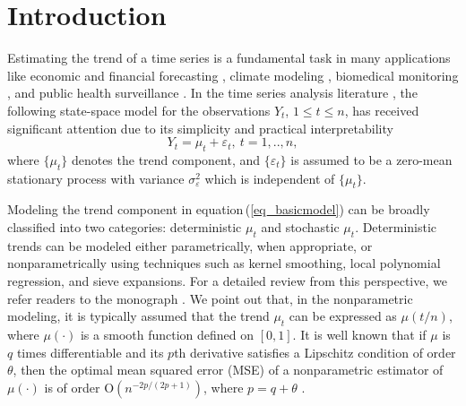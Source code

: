 \documentclass[11pt]{article}
\numberwithin{equation}{section}
\numberwithin{figure}{section}
\begin{document}
\section{Introduction}
Estimating the trend of a time series is a fundamental task in many applications like economic and financial forecasting \cite{hatanaka1996,tsay2010analysis}, climate modeling \cite{MUDELSEE2019310}, biomedical monitoring \cite{patharkar2024predictive}, and public health surveillance \cite{ensor2024online}. In the time series analysis literature \cite{brockwell2016introduction,commandeur2007introduction,durbin2000,shumway2025}, the following state-space model for the observations $Y_t$, $1 \leq t \leq n$, has received significant attention due to its simplicity and practical interpretability
\begin{equation}\label{eq_basicmodel}
Y_{t}=\mu_{t}+\varepsilon_{t}, \ t=1,..,n, 
\end{equation}
where $\{\mu_t\}$ denotes the trend component, and $\{\varepsilon_t\}$ is assumed to be a zero-mean stationary process with variance $\sigma^2_\varepsilon$ which is independent of $\{\mu_t\}$.

Modeling the trend component in equation (\ref{eq_basicmodel}) can be broadly classified into two categories: deterministic $\mu_t$ and stochastic $\mu_t$. Deterministic trends can be modeled either parametrically, when appropriate, or nonparametrically using techniques such as kernel smoothing, local polynomial regression, and sieve expansions. For a detailed review from this perspective, we refer readers to the monograph \cite{fan2003}. We point out that, in the nonparametric modeling, it is typically assumed that the trend $\mu_t$ can be expressed as $\mu(t/n)$, where $\mu(\cdot)$ is a smooth function defined on $[0,1]$. It is well known that if $\mu$ is $q$ times differentiable and its $p$th derivative satisfies a Lipschitz condition of order $\theta$, then the optimal mean squared error (MSE) of a nonparametric estimator of $\mu(\cdot)$ is of order $\mathrm{O}(n^{-2p/(2p+1)})$, where $p = q + \theta$ \cite{stone1982}.
\end{document}
